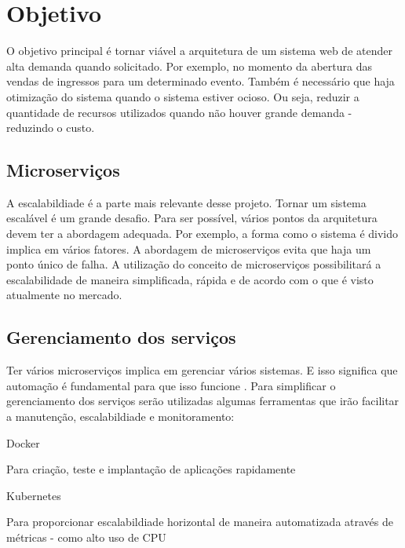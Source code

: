 \chapter{Objetivo}

O objetivo principal é tornar viável a arquitetura de um sistema web de atender
alta demanda quando solicitado. Por exemplo, no momento da abertura das vendas
de ingressos para um determinado evento. Também é necessário que haja otimização
do sistema quando o sistema estiver ocioso. Ou seja, reduzir a quantidade de
recursos utilizados quando não houver grande demanda - reduzindo o custo.

\section{Microserviços}

A escalabildiade é a parte mais relevante desse projeto. Tornar um sistema escalável
é um grande desafio. Para ser possível, vários pontos da arquitetura devem ter a
abordagem adequada. Por exemplo, a forma como o sistema é divido implica em vários
fatores. A abordagem de microserviços evita que haja um ponto único de falha. A
utilização do conceito de microserviços possibilitará a escalabilidade de maneira
simplificada, rápida e de acordo com o que é visto atualmente no mercado.

\section{Gerenciamento dos serviços}

Ter vários microserviços implica em gerenciar
vários sistemas. E isso significa que automação é fundamental para que isso funcione
\cite{martin-fowler-microservices}.
Para simplificar o gerenciamento dos serviços serão utilizadas algumas ferramentas que
irão facilitar a manutenção, escalabildiade e monitoramento:

\begin{alineas}

  \item Docker

  \begin{alineas}
     \item Para criação, teste e implantação de aplicações rapidamente \cite{aws-o-que-e-o-docker}
  \end{alineas}

  \item Kubernetes

  \begin{alineas}
     \item Para proporcionar escalabildiade horizontal de maneira automatizada através de métricas
           - como alto uso de CPU \cite{kubernetes-horizontal-pod-autoscaling}
  \end{alineas}

\end{alineas}
